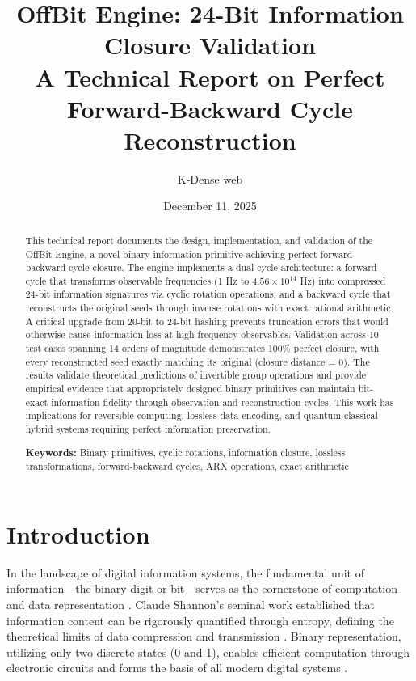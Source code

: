 \documentclass[11pt,letterpaper]{article}
\title{\textbf{OffBit Engine: 24-Bit Information Closure Validation}\\
\large{A Technical Report on Perfect Forward-Backward Cycle Reconstruction}}
\author{K-Dense web}
\date{December 11, 2025}
\begin{document}
\maketitle

\begin{abstract}
This technical report documents the design, implementation, and validation of the OffBit Engine, a novel binary information primitive achieving perfect forward-backward cycle closure. The engine implements a dual-cycle architecture: a forward cycle that transforms observable frequencies (1 Hz to $4.56 \times 10^{14}$ Hz) into compressed 24-bit information signatures via cyclic rotation operations, and a backward cycle that reconstructs the original seeds through inverse rotations with exact rational arithmetic. A critical upgrade from 20-bit to 24-bit hashing prevents truncation errors that would otherwise cause information loss at high-frequency observables. Validation across 10 test cases spanning 14 orders of magnitude demonstrates 100\% perfect closure, with every reconstructed seed exactly matching its original (closure distance = 0). The results validate theoretical predictions of invertible group operations and provide empirical evidence that appropriately designed binary primitives can maintain bit-exact information fidelity through observation and reconstruction cycles. This work has implications for reversible computing, lossless data encoding, and quantum-classical hybrid systems requiring perfect information preservation.

\textbf{Keywords:} Binary primitives, cyclic rotations, information closure, lossless transformations, forward-backward cycles, ARX operations, exact arithmetic
\end{abstract}

\section{Introduction}
\label{sec:introduction}

In the landscape of digital information systems, the fundamental unit of information—the binary digit or bit—serves as the cornerstone of computation and data representation \cite{shannon1948,binary2025}. Claude Shannon's seminal work established that information content can be rigorously quantified through entropy, defining the theoretical limits of data compression and transmission \cite{shannon1948,entropy2024}. Binary representation, utilizing only two discrete states (0 and 1), enables efficient computation through electronic circuits and forms the basis of all modern digital systems \cite{binary2025}.
\end{document}
